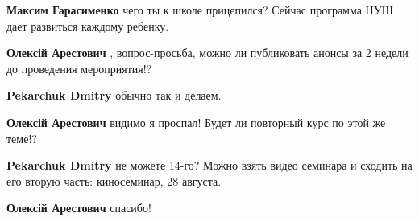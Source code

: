 \begin{itemize}
\begin{itemize}
\textbf{Максим Гарасименко} чего ты к школе прицепился? Сейчас программа НУШ дает развиться каждому ребенку.

\end{itemize}

 
\textbf{Олексій Арестович} , вопрос-просьба, можно ли публиковать анонсы за 2 недели до проведения мероприятия!?

\begin{itemize}
 
\textbf{Pekarchuk Dmitry} обычно так и делаем.

 
\textbf{Олексій Арестович} видимо я проспал! Будет ли повторный курс по этой же теме!?


 
\textbf{Pekarchuk Dmitry} не можете 14-го?
Можно взять видео семинара и сходить на его вторую часть: киносеминар, 28 августа.

 
\textbf{Олексій Арестович} спасибо!
\end{itemize}

 


\end{itemize}
